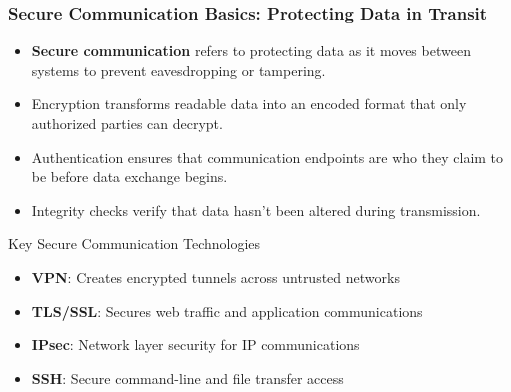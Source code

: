 \documentclass{beamer}
\begin{document}
\begin{frame}
    \frametitle{Secure Communication Basics: Protecting Data in Transit}
    \begin{itemize}
        \item \textbf{Secure communication} refers to protecting data as it moves between systems to prevent eavesdropping or tampering.
        \item Encryption transforms readable data into an encoded format that only authorized parties can decrypt.
        \item Authentication ensures that communication endpoints are who they claim to be before data exchange begins.
        \item Integrity checks verify that data hasn't been altered during transmission.
    \end{itemize}
    
    \begin{exampleblock}{Key Secure Communication Technologies}
        \begin{itemize}
            \item \textbf{VPN}: Creates encrypted tunnels across untrusted networks
            \item \textbf{TLS/SSL}: Secures web traffic and application communications
            \item \textbf{IPsec}: Network layer security for IP communications
            \item \textbf{SSH}: Secure command-line and file transfer access
        \end{itemize}
    \end{exampleblock}
\end{frame}
\end{document}
